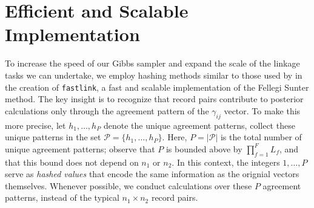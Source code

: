 \documentclass[12pt,letterpaper]{article}
\newcommand{\1}[1]{\mathbb{I}\!\left[#1\right]} %
\begin{document}
%
%
%
%

\section{Efficient and Scalable Implementation}
\label{sec:efficiency}

To increase the speed of our Gibbs sampler and expand the scale of the linkage tasks we can undertake, we employ hashing methods similar to those used by \cite{enamorado2019using} in the creation of \texttt{fastlink}, a fast and scalable implementation of the Fellegi Sunter method. The key insight is to recognize that record pairs contribute to posterior calculations only through the agreement pattern of the $\gamma_{ij}$ vector. To make this more precise, let $h_1, \ldots, h_P$ denote the unique agreement patterns, collect these unique patterns in the set $\mathcal{P} = \{h_1, \ldots, h_P\}$. Here, 
$P = |\mathcal{P}|$ is the total number of unique agreement
patterns; observe that \(P\) is bounded above by \(\prod_{f=1}^F L_f\), and that this bound does not depend on \(n_1\) or \(n_2\). In this context, the integers $1, \ldots, P$ serve as \emph{hashed values} that encode the same information as the orignial vectors themselves. Whenever possible, we conduct calculations over these \(P\) agreement
patterns, instead of the typical \(n_1 \times n_2\) record pairs.
\end{document}
